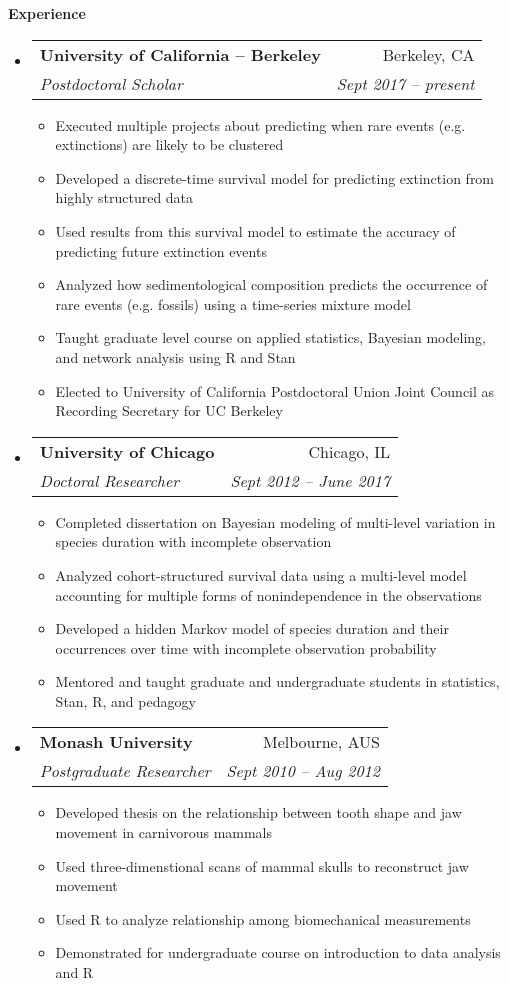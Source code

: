 \documentclass[letterpaper,11pt]{article}
\makeatletter
\newcommand{\resitem}[1]{\item #1 \vspace{-2pt}}
\newcommand{\resheading}[1]{{\large \colorbox{mygrey}{\begin{minipage}{\textwidth}{\textbf{#1 \vphantom{p\^{E}}}}\end{minipage}}}}
\newcommand{\ressubheading}[4]{
  \begin{tabular*}{6.5in}{l@{\extracolsep{\fill}}r}
    \textbf{#1} & #2 \\
    \textit{#3} & \textit{#4} \\
\end{tabular*}\vspace{-6pt}}
\makeatother
\begin{document}
\resheading{Experience}
\begin{itemize}
  \item 
    \ressubheading{University of California -- Berkeley}{Berkeley, CA}{Postdoctoral Scholar}{Sept 2017 -- present}
    { \footnotesize
      \begin{itemize}
          \resitem{Executed multiple projects about predicting when rare events (e.g. extinctions) are likely to be clustered }
          \resitem{Developed a discrete-time survival model for predicting extinction from highly structured data }
          \resitem{Used results from this survival model to estimate the accuracy of predicting future extinction events }
          \resitem{Analyzed how sedimentological composition predicts the occurrence of rare events (e.g. fossils) using a time-series mixture model }
          \resitem{Taught graduate level course on applied statistics, Bayesian modeling, and network analysis using R and Stan }
          \resitem{Elected to University of California Postdoctoral Union Joint Council as Recording Secretary for UC Berkeley }
      \end{itemize}
    }
  \item 
    \ressubheading{University of Chicago}{Chicago, IL}{Doctoral Researcher}{Sept 2012 -- June 2017}
    { \footnotesize
      \begin{itemize}
          \resitem{Completed dissertation on Bayesian modeling of multi-level variation in species duration with incomplete observation }
          \resitem{Analyzed cohort-structured survival data using a multi-level model accounting for multiple forms of nonindependence in the observations }
          \resitem{Developed a hidden Markov model of species duration and their occurrences over time with incomplete observation probability }
          \resitem{Mentored and taught graduate and undergraduate students in statistics, Stan, R, and pedagogy }
      \end{itemize}
    }
		\item 
			\ressubheading{Monash University}{Melbourne, AUS}{Postgraduate Researcher}{Sept 2010 -- Aug 2012}
				{ \footnotesize
				\begin{itemize}
            \resitem{Developed thesis on the relationship between tooth shape and jaw movement in carnivorous mammals }
            \resitem{Used three-dimenstional scans of mammal skulls to reconstruct jaw movement }
            \resitem{Used R to analyze relationship among biomechanical measurements }
            \resitem{Demonstrated for undergraduate course on introduction to data analysis and R }

\end{itemize}}
\end{itemize}
\end{document}
